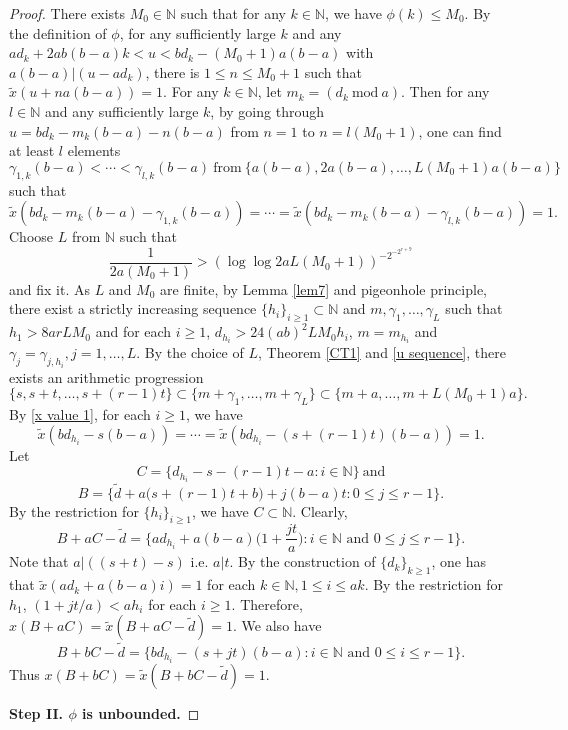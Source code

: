 \documentclass[reqno,12pt]{amsart}
\def \N {\mathbb N}
\numberwithin{equation}{section}
\begin{document}
\begin{proof}
	There exists $M_0\in \N$ such that for any $k\in \N$, we have $\phi(k)\le M_0$. By the definition of $\phi$, for any sufficiently large $k$ and any  $ad_k+2ab(b-a)k<u<bd_k-(M_0+1)a(b-a)$ with $a(b-a)|(u-ad_k) $, there is $1\leq n\leq M_0+1$ such that $\tilde{x}(u+na(b-a))=1$. For any $k\in \N$, let $m_k=(d_k\ \text{mod}\ a)$. Then for any $l\in \N$ and any sufficiently large $k$, by going through $u=bd_k-m_k(b-a)-n(b-a) $ from $n=1$ to $n=l(M_0+1)$, one can find at least $l$ elements
\begin{equation}\label{u sequence}\gamma_{1,k}(b-a)<\cdots<\gamma_{l,k}(b-a)\ \text{from}\ \{a(b-a),2a(b-a),\ldots,L(M_0+1)a(b-a)\}
\end{equation}
such that
\begin{equation}\label{x value 1}\tilde{x}(bd_k-m_k(b-a)-\gamma_{1,k}(b-a))=\cdots=\tilde{x}(bd_k-m_k(b-a)-\gamma_{l,k}(b-a))=1.
\end{equation}
 Choose $L$ from $\N$ such that
	$$\frac{1}{2a(M_0+1)}> (\log \log 2aL (M_0+1))^{-2^{-2^{r+9}}}$$ and fix it.
	As $L$ and $M_0$ are finite, by Lemma \ref{lem7} and pigeonhole principle, there exist a strictly increasing sequence $\{h_i\}_{i\geq 1}\subset \N$ and $m,\gamma_1,\ldots,\gamma_L$ such that $h_1>8arLM_0$ and for each $i\ge 1$, $d_{h_i}>24(ab)^{2}LM_0h_i$, $m=m_{h_i}$ and $\gamma_j=\gamma_{j,h_i},j=1,\ldots,L$.  By the choice of $L$, Theorem \ref{CT1} and \eqref{u sequence}, there exists an arithmetic progression
$$ \{s,s+t,\ldots,s+(r-1)t\}\subset \{m+\gamma_1,\ldots,m+\gamma_L\}\subset \{m+a,\ldots,m+L(M_0+1)a\}.$$
By \eqref{x value 1}, for each $i\ge 1$, we have
$$\tilde{x}(bd_{h_i}-s(b-a))=\cdots=\tilde{x}(bd_{h_i}-(s+(r-1)t)(b-a))=1. $$
Let $$C=\Big\{d_{h_i}-s-(r-1)t-a:i\in\N\Big\}\ \text{and}$$
	$$B=\Big\{\tilde{d}+a\Big(s+(r-1)t+b\Big)+j(b-a)t:0\le j\le r-1\Big\}.$$
By the restriction for $\{h_i\}_{i\ge 1}$, we have $C\subset \N$. Clearly,
$$B+aC-\tilde{d}=\Big\{ad_{h_i}+a(b-a)\Big(1+\frac{jt}{a}\Big):i\in \N  \text{ and }0 \le j\le r-1\Big\}. $$
Note that $a|((s+t)-s)$ i.e. $a|t$. By the construction of $\{d_k\}_{k\ge 1}$, one has that $\tilde{x}(ad_{k}+a(b-a)i)=1$ for each $k\in \N,1\le i\le ak$. By the restriction for $h_1$, $(1+jt/a)<ah_i$ for each $i\ge 1$. Therefore, $x(B+aC)=\tilde{x}(B+aC-\tilde{d})=1$. We also have
$$B+bC-\tilde{d}=\Big\{bd_{h_i}-(s+jt)(b-a): i\in \N  \text{ and } 0\le i\le r-1\Big\}. $$
Thus $x(B+bC)=\tilde{x}(B+bC-\tilde{d})=1$.


	\noindent \textbf{Step II. $\phi$ is unbounded.}
	

\end{proof}
\end{document}
